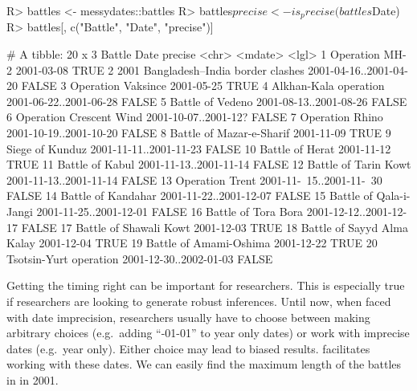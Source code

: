 \documentclass[
]{jss}
\begin{document}
\begin{CodeChunk}
\begin{CodeInput}
R> battles <- messydates::battles
R> battles$precise <- is_precise(battles$Date)
R> battles[, c("Battle", "Date", "precise")]
\end{CodeInput}
\begin{CodeOutput}
# A tibble: 20 x 3
   Battle                               Date                     precise
   <chr>                                <mdate>                  <lgl>  
 1 Operation MH-2                       2001-03-08               TRUE   
 2 2001 Bangladesh–India border clashes 2001-04-16..2001-04-20   FALSE  
 3 Operation Vaksince                   2001-05-25               TRUE   
 4 Alkhan-Kala operation                2001-06-22..2001-06-28   FALSE  
 5 Battle of Vedeno                     2001-08-13..2001-08-26   FALSE  
 6 Operation Crescent Wind              2001-10-07..2001-12?     FALSE  
 7 Operation Rhino                      2001-10-19..2001-10-20   FALSE  
 8 Battle of Mazar-e-Sharif             2001-11-09               TRUE   
 9 Siege of Kunduz                      2001-11-11..2001-11-23   FALSE  
10 Battle of Herat                      2001-11-12               TRUE   
11 Battle of Kabul                      2001-11-13..2001-11-14   FALSE  
12 Battle of Tarin Kowt                 2001-11-13..2001-11-14   FALSE  
13 Operation Trent                      2001-11-~15..2001-11-~30 FALSE  
14 Battle of Kandahar                   2001-11-22..2001-12-07   FALSE  
15 Battle of Qala-i-Jangi               2001-11-25..2001-12-01   FALSE  
16 Battle of Tora Bora                  2001-12-12..2001-12-17   FALSE  
17 Battle of Shawali Kowt               2001-12-03               TRUE   
18 Battle of Sayyd Alma Kalay           2001-12-04               TRUE   
19 Battle of Amami-Oshima               2001-12-22               TRUE   
20 Tsotsin-Yurt operation               2001-12-30..2002-01-03   FALSE  
\end{CodeOutput}
\end{CodeChunk}

Getting the timing right can be important for researchers. This is
especially true if researchers are looking to generate robust
inferences. Until now, when faced with date imprecision, researchers
usually have to choose between making arbitrary choices (e.g.~adding
``-01-01'' to year only dates) or work with imprecise dates (e.g.~year
only). Either choice may lead to biased results. 
facilitates working with these dates. We can easily find the maximum
length of the battles in in 2001.
\end{document}
